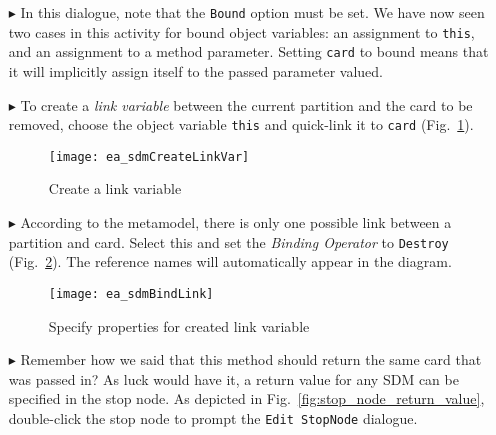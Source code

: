 \begin{itemize}
\vspace{0.5cm}

\item[$\blacktriangleright$] In this dialogue, note that the \texttt{Bound} option must be set. We have now seen two cases in this activity for bound object
variables: an assignment to \texttt{this}, and an assignment to a method parameter. Setting \texttt{card} to bound means that it will implicitly assign itself
to the passed parameter valued.

\item[$\blacktriangleright$] To create a \emph{link variable} between the current partition and the card to be removed, choose the object variable \texttt{this}
and quick-link it to \texttt{card} (Fig.~\ref{fig:link_variable}).

\begin{figure}[htpb]
\begin{center}
  \texttt{[image: ea\_sdmCreateLinkVar]}
  \caption{Create a link variable}   
  \label{fig:link_variable}
\end{center}
\end{figure}

\vspace{0.5cm}

\item[$\blacktriangleright$] According to the metamodel, there is only one possible link between a partition and card. Select this and set the
\emph{Binding Operator} to \texttt{Destroy} (Fig.~\ref{fig:link_variable_properties}). The reference names will automatically appear in the diagram.

\vspace{0.5cm}

\begin{figure}[h!]
\begin{center} 
 \texttt{[image: ea\_sdmBindLink]}
  \caption{Specify properties for created link variable}  
  \label{fig:link_variable_properties}
\end{center}
\end{figure}

\vspace{0.5cm}

\item[$\blacktriangleright$] Remember how we said that this method should return the same card that was passed in? As luck would have it, a return value for any
SDM can be specified in the stop node. As depicted in Fig.~\ref{fig:stop_node_return_value}, double-click the stop node to prompt the \texttt{Edit StopNode} dialogue. 


\end{itemize}
